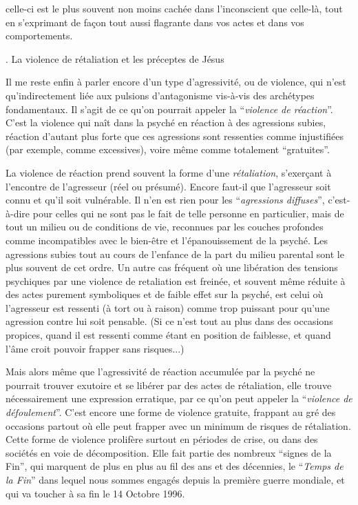 
celle-ci est le plus souvent non moins cachée dans l’inconscient que celle-là, tout en s’exprimant de façon tout aussi flagrante dans vos actes et dans vos comportements.

. La violence de rétaliation et les préceptes de Jésus

Il me reste enfin à parler encore d’un type d’agressivité, ou de violence, qui n’est qu’indirectement liée aux pulsions d’antagonisme vis-à-vis des archétypes fondamentaux. Il s’agit de ce qu’on pourrait appeler la ``\textit{violence de réaction}''. C’est la violence qui naît dans la psyché en réaction à des agressions subies, réaction d’autant plus forte que ces agressions sont ressenties comme injustifiées (par exemple, comme excessives), voire même comme totalement ``gratuites''.

La violence de réaction prend souvent la forme d’une \textit{rétaliation}, s’exerçant à l’encontre de l’agresseur (réel ou présumé). Encore faut-il que l’agresseur soit connu et qu’il soit vulnérable. Il n’en est rien pour les ``\textit{agressions diffuses}'', c’est-à-dire pour celles qui ne sont pas le fait de telle personne en particulier, mais de tout un milieu ou de conditions de vie, reconnues par les couches profondes comme incompatibles avec le bien-être et l’épanouissement de la psyché. Les agressions subies tout au cours de l’enfance de la part du milieu parental sont le plus souvent de cet ordre. Un autre cas fréquent où une libération des tensions psychiques par une violence de retaliation est freinée, et souvent même réduite à des actes purement symboliques et de faible effet sur la psyché, est celui où l’agresseur est ressenti (à tort ou à raison) comme trop puissant pour qu’une agression contre lui soit pensable. (Si ce n’est tout au plus dans des occasions propices, quand il est ressenti comme étant en position de faiblesse, et quand l’âme croit pouvoir frapper sans risques...)

Mais alors même que l’agressivité de réaction accumulée par la psyché ne pourrait trouver exutoire et se libérer par des actes de rétaliation, elle trouve nécessairement une expression erratique, par ce qu’on peut appeler la ``\textit{violence de défoulement}''. C’est encore une forme de violence gratuite, frappant au gré des occasions partout où elle peut frapper avec un minimum de risques de rétaliation. Cette forme de violence prolifère surtout en périodes de crise, ou dans des sociétés en voie de décomposition. Elle fait partie des nombreux ``signes de la Fin'', qui marquent de plus en plus au fil des ans et des décennies, le ``\textit{Temps de la Fin}'' dans lequel nous sommes engagés depuis la première guerre mondiale, et qui va toucher à sa fin le 14 Octobre 1996.

